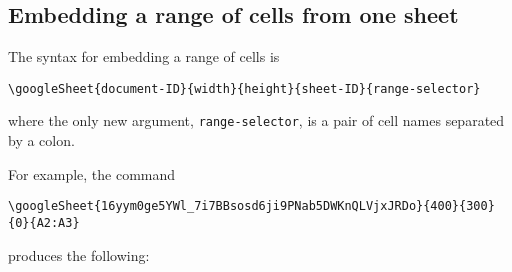 \documentclass{ximera}
\begin{document}


\subsection{Embedding a range of cells from one sheet}

The syntax for embedding a range of cells is
\begin{verbatim}
\googleSheet{document-ID}{width}{height}{sheet-ID}{range-selector}
\end{verbatim}
where the only new argument, \texttt{range-selector}, is a pair of cell names separated by a colon.

For example, the command
\begin{verbatim}
\googleSheet{16yym0ge5YWl_7i7BBsosd6ji9PNab5DWKnQLVjxJRDo}{400}{300}{0}{A2:A3}
\end{verbatim}
produces the following:

\end{document}
